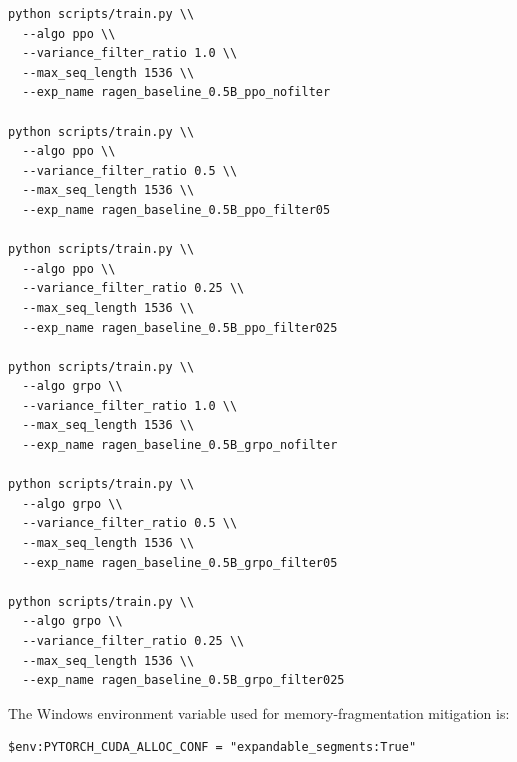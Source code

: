 \begin{Verbatim}[fontsize=\small,breaklines=true,breakanywhere=true]
python scripts/train.py \\
  --algo ppo \\
  --variance_filter_ratio 1.0 \\
  --max_seq_length 1536 \\
  --exp_name ragen_baseline_0.5B_ppo_nofilter

python scripts/train.py \\
  --algo ppo \\
  --variance_filter_ratio 0.5 \\
  --max_seq_length 1536 \\
  --exp_name ragen_baseline_0.5B_ppo_filter05

python scripts/train.py \\
  --algo ppo \\
  --variance_filter_ratio 0.25 \\
  --max_seq_length 1536 \\
  --exp_name ragen_baseline_0.5B_ppo_filter025

python scripts/train.py \\
  --algo grpo \\
  --variance_filter_ratio 1.0 \\
  --max_seq_length 1536 \\
  --exp_name ragen_baseline_0.5B_grpo_nofilter

python scripts/train.py \\
  --algo grpo \\
  --variance_filter_ratio 0.5 \\
  --max_seq_length 1536 \\
  --exp_name ragen_baseline_0.5B_grpo_filter05

python scripts/train.py \\
  --algo grpo \\
  --variance_filter_ratio 0.25 \\
  --max_seq_length 1536 \\
  --exp_name ragen_baseline_0.5B_grpo_filter025
\end{Verbatim}

The Windows environment variable used for memory-fragmentation mitigation is:
\begin{Verbatim}[fontsize=\small,breaklines=true,breakanywhere=true]
$env:PYTORCH_CUDA_ALLOC_CONF = "expandable_segments:True"
\end{Verbatim}

